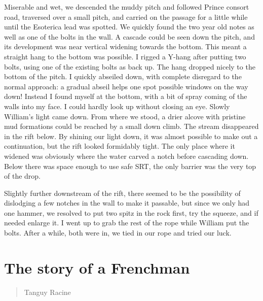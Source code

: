 \documentclass[onecolumn]{book}
\begin{document}
Miserable and wet, we descended the muddy pitch and followed Prince consort road, traversed over a small pitch, and carried on the passage for a little while until the Esoterica lead was spotted. We quickly found the two year old notes as well as one of the bolts in the wall. A cascade could be seen down the pitch, and its development was near vertical widening towards the bottom. This meant a straight hang to the bottom was possible. I rigged a Y-hang after putting two bolts, using one of the existing bolts as back up. The hang dropped nicely to the bottom of the pitch. I quickly abseiled down, with complete disregard to the normal approach: a gradual abseil helps one spot possible windows on the way down! 
Instead I found myself at the bottom, with a bit of spray coming of the walls into my face. I could hardly look up without closing an eye. Slowly William's light came down. From where we stood, a drier alcove with pristine mud formations could be reached by a small down climb. The stream disappeared in the rift below. By shining our light down, it was almost possible to make out a continuation, but the rift looked formidably tight. The only place where it widened was obviously where the water carved a notch before cascading down. Below there was space enough to use safe SRT, the only barrier was the very top of the drop.

Slightly further downstream of the rift, there seemed to be the possibility of dislodging a few notches in the wall to make it passable, but since we only had one hammer, we resolved to put two spitz in the rock first, try the squeeze, and if needed enlarge it. I went up to grab the rest of the rope while William put the bolts. After a while, both were in, we tied in our rope and tried our luck. 

\section{The story of a Frenchman}
\begin{verse}
Tanguy Racine
\end{verse}
\end{document}
